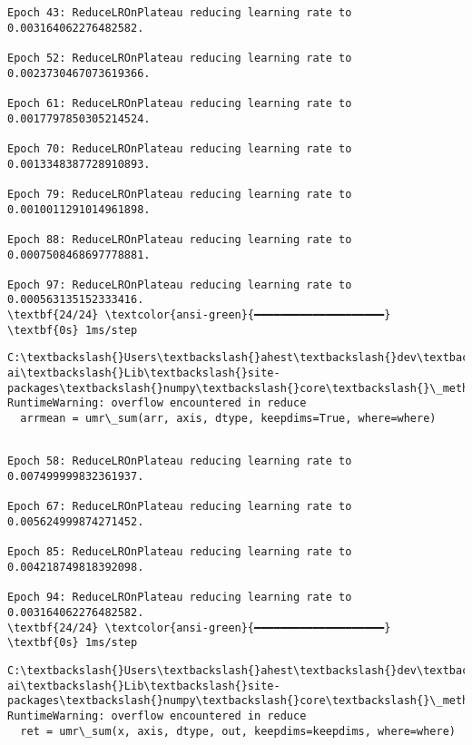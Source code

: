 \documentclass[11pt]{article}
\begin{document}
\begin{Verbatim}[commandchars=\\\{\}]
Epoch 43: ReduceLROnPlateau reducing learning rate to 0.003164062276482582.

Epoch 52: ReduceLROnPlateau reducing learning rate to 0.0023730467073619366.

Epoch 61: ReduceLROnPlateau reducing learning rate to 0.0017797850305214524.

Epoch 70: ReduceLROnPlateau reducing learning rate to 0.0013348387728910893.

Epoch 79: ReduceLROnPlateau reducing learning rate to 0.0010011291014961898.

Epoch 88: ReduceLROnPlateau reducing learning rate to 0.0007508468697778881.

Epoch 97: ReduceLROnPlateau reducing learning rate to 0.000563135152333416.
\textbf{24/24} \textcolor{ansi-green}{━━━━━━━━━━━━━━━━━━━━} \textbf{0s} 1ms/step
    \end{Verbatim}

    \begin{Verbatim}[commandchars=\\\{\}]
C:\textbackslash{}Users\textbackslash{}ahest\textbackslash{}dev\textbackslash{}.venv-ai\textbackslash{}Lib\textbackslash{}site-packages\textbackslash{}numpy\textbackslash{}core\textbackslash{}\_methods.py:152:
RuntimeWarning: overflow encountered in reduce
  arrmean = umr\_sum(arr, axis, dtype, keepdims=True, where=where)
    \end{Verbatim}

    \begin{Verbatim}[commandchars=\\\{\}]

Epoch 58: ReduceLROnPlateau reducing learning rate to 0.007499999832361937.

Epoch 67: ReduceLROnPlateau reducing learning rate to 0.005624999874271452.

Epoch 85: ReduceLROnPlateau reducing learning rate to 0.004218749818392098.

Epoch 94: ReduceLROnPlateau reducing learning rate to 0.003164062276482582.
\textbf{24/24} \textcolor{ansi-green}{━━━━━━━━━━━━━━━━━━━━} \textbf{0s} 1ms/step
    \end{Verbatim}

    \begin{Verbatim}[commandchars=\\\{\}]
C:\textbackslash{}Users\textbackslash{}ahest\textbackslash{}dev\textbackslash{}.venv-ai\textbackslash{}Lib\textbackslash{}site-packages\textbackslash{}numpy\textbackslash{}core\textbackslash{}\_methods.py:187:
RuntimeWarning: overflow encountered in reduce
  ret = umr\_sum(x, axis, dtype, out, keepdims=keepdims, where=where)
    \end{Verbatim}
\end{document}
